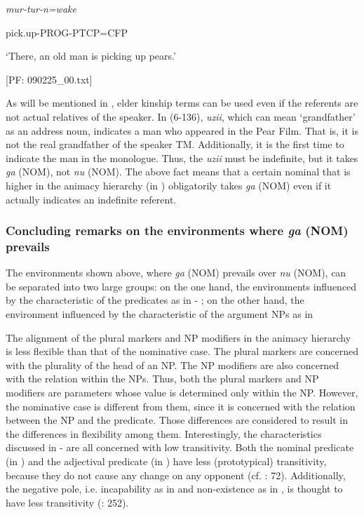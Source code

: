     \textit{mur-tur-n=wake}

    pick.up-PROG-PTCP=CFP

    ‘There, an old man is picking up pears.’

    [PF: 090225\_00.txt]

As will be mentioned in , elder kinship terms can be used even if the referents are not actual relatives of the speaker. In (6-136), \textit{uzii}, which can mean ‘grandfather’ as an address noun, indicates a man who appeared in the Pear Film. That is, it is not the real grandfather of the speaker TM. Additionally, it is the first time to indicate the man in the monologue. Thus, the \textit{uzii} must be indefinite, but it takes \textit{ga} (NOM), not \textit{nu} (NOM). The above fact means that a certain nominal that is higher in the animacy hierarchy (in ) obligatorily takes \textit{ga} (NOM) even if it actually indicates an indefinite referent.

\subsubsection{Concluding remarks on the environments where \textit{ga} (NOM) prevails}

The environments shown above, where \textit{ga} (NOM) prevails over \textit{nu} (NOM), can be separated into two large groups: on the one hand, the environments influenced by the characteristic of the predicates as in  - ; on the other hand, the environment influenced by the characteristic of the argument NPs as in 

The alignment of the plural markers and NP modifiers in the animacy hierarchy is less flexible than that of the nominative case. The plural markers are concerned with the plurality of the head of an NP. The NP modifiers are also concerned with the relation within the NPs. Thus, both the plural markers and NP modifiers are parameters whose value is determined only within the NP. However, the nominative case is different from them, since it is concerned with the relation between the NP and the predicate. Those differences are considered to result in the differences in flexibility among them. Interestingly, the characteristics discussed in  -  are all concerned with low transitivity. Both the nominal predicate (in ) and the adjectival predicate (in ) have less (prototypical) transitivity, because they do not cause any change on any opponent (cf. \citealt{Tsunoda1991}: 72). Additionally, the negative pole, i.e. incapability as in  and non-existence as in , is thought to have less transitivity (\citealt{HopperThompson1980}: 252).

